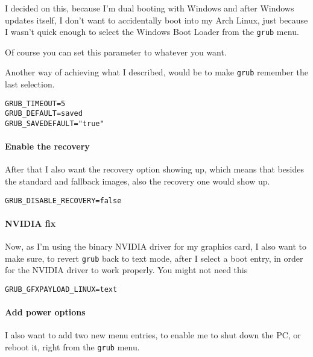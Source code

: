 \documentclass[10pt]{dustdoc}
\begin{document}
\begin{NOTE}
    I decided on this, because I’m dual booting with Windows and after Windows updates itself, I don’t want to accidentally boot into my Arch Linux, just because I wasn’t quick enough to select the Windows Boot Loader from the \texttt{grub} menu.

    Of course you can set this parameter to whatever you want.

    Another way of achieving what I described, would be to make \texttt{grub} remember the last selection.

    \begin{verbatim}
GRUB_TIMEOUT=5
GRUB_DEFAULT=saved
GRUB_SAVEDEFAULT="true"
    \end{verbatim}
\end{NOTE}

\paragraph{Enable the recovery}
\label{par:enable-the-recovery}

After that I also want the recovery option showing up, which means that besides the standard and fallback images, also the recovery one would show up.

\begin{verbatim}
GRUB_DISABLE_RECOVERY=false
\end{verbatim}

\paragraph{NVIDIA fix}
\label{par:nvidia-fix}

Now, as I’m using the binary NVIDIA driver for my graphics card, I also want to make sure, to revert \texttt{grub} back to text mode, after I select a boot entry, in order for the NVIDIA driver to work properly.
You might not need this

\begin{verbatim}
GRUB_GFXPAYLOAD_LINUX=text
\end{verbatim}

\paragraph{Add power options}
\label{par:add-power-options}

I also want to add two new menu entries, to enable me to shut down the PC, or reboot it, right from the \texttt{grub} menu.
\end{document}
